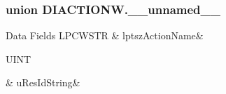 \subsubsection{union D\-I\-A\-C\-T\-I\-O\-N\-W.\-\_\-\-\_\-unnamed\-\_\-\-\_\-}
\begin{DoxyFields}{Data Fields}
\hypertarget{a00003_a306924baa797b5e48dc1e53cd5fa6e58}{L\-P\-C\-W\-S\-T\-R}\label{a00003_a306924baa797b5e48dc1e53cd5fa6e58}
&
lptsz\-Action\-Name&
\\
\hline

\hypertarget{a00003_a218c793f10200f6283aa0d41c3626ffc}{U\-I\-N\-T}\label{a00003_a218c793f10200f6283aa0d41c3626ffc}
&
u\-Res\-Id\-String&
\\
\hline

\end{DoxyFields}
\label{d3/d8b/a00059}
\hypertarget{a00003_d3/d8b/a00059}{}
